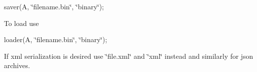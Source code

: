 {\ttfamily saver(A, \char`\"{}filename.\+bin\char`\"{}, \char`\"{}binary\char`\"{});}

To load use

{\ttfamily loader(A, \char`\"{}filename.\+bin\char`\"{}, \char`\"{}binary\char`\"{});}

If {\ttfamily xml} serialization is desired use \char`\"{}file.\+xml\char`\"{} and \char`\"{}xml\char`\"{} instead and similarly for json archives. 